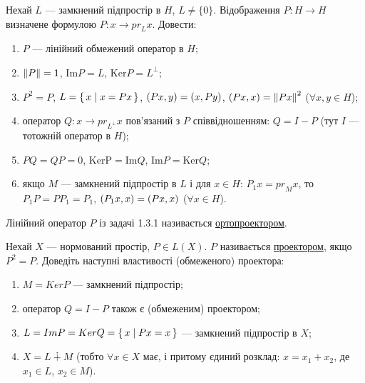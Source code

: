 
\begin{exercise}
    Нехай $L$ --- замкнений підпростір в $H$, $L \neq \{0\}$. 
    Відображення $P: H \rightarrow H$ визначене формулою 
    $P: x \rightarrow {pr}_L x$. Довести:
    \begin{enumerate}[label=\ukr*)]
        \item $P$ --- лінійний обмежений оператор в $H$;
        \item $\left\lVert P\right\rVert = 1$, $\mathrm{Im}P = L$, $\mathrm{Ker} P = L^\bot$;
        \item $P^2 = P$, $L = \set{x \mid x=Px}$, $\left(Px, y\right)=\left(x, Py\right)$,
        $\left(Px, x\right) = \left\lVert Px\right\rVert^2$ ($\forall x,y \in H$);
        \item оператор $Q: x \rightarrow {pr}_{L^\bot}x$ пов'язаний з $P$ 
        співвідношенням: $Q = I-P$ (тут $I$ --- тотожній оператор в $H$);
        \item $PQ = QP = 0$, $\mathrm{KerP} = \mathrm{Im}Q$, $\mathrm{Im}P = \mathrm{Ker}Q$;
        \item якщо $M$ --- замкнений підпростір в $L$ і для $x \in H$:
        $P_1 x = {pr}_M x$, то $P_1 P = P P_1 = P_1$,
        $\left(P_1x, x\right) = \left(Px, x\right)$ ($\forall x \in H$).
    \end{enumerate}
\end{exercise}

\begin{theory}
    Лінійний оператор $P$ із задачі 1.3.1 називається \uline{ортопроектором}.
\end{theory}

\begin{exercise}
    Нехай $X$ --- нормований простір, $P \in L(X)$.
    $P$ називається \uline{проектором}, якщо $P^2=P$. Доведіть наступні 
    властивості (обмеженого) проектора:
    \begin{enumerate}[label=\ukr*)]
        \item $M = KerP$ --- замкнений підпростір;
        \item оператор $Q = I - P$ також є (обмеженим) проектором;
        \item $L=ImP=KerQ=\set{x \mid Px=x}$ --- замкнений підпростір в $X$;
        \item $X = L \dotplus M$ (тобто $\forall x \in X$ має, і притому 
        єдиний розклад: $x=x_1+x_2$, де $x_1 \in L$, $x_2 \in M$).
    \end{enumerate}
\end{exercise}

